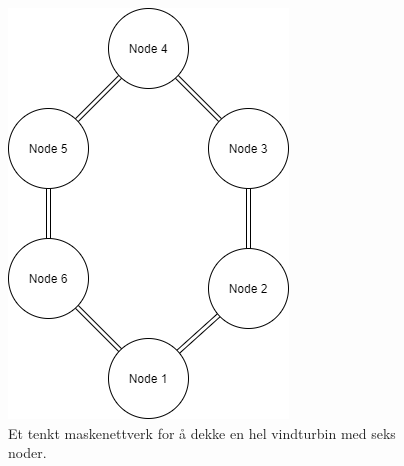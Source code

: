 \begin{figure}[!htbp]
  \centering
  \begin{minipage}[b]{0.45\textwidth}
    \includegraphics[width=\textwidth]{konklusjon/Mesh.png}
    \caption{Et tenkt maskenettverk for å dekke en hel vindturbin med seks noder. }
    \label{fig:maskenettverk}
  \end{minipage}
  \hfill
  \begin{minipage}[b]{0.45\textwidth}

\end{minipage}
\end{figure}

